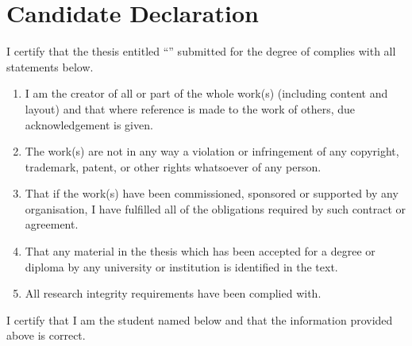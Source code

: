 \newpage
\chapter*{Candidate Declaration}

I certify that the thesis entitled ``\textit{\thetitle{}}'' submitted for the degree of \thedegree{} complies with all statements below.\bigskip
\begin{enumerate}[label=(\roman*)]
  \item I am the creator of all or part of the whole work(s) (including content and layout) and that where reference is made to the work of others, due acknowledgement is given.    
  \item The work(s) are not in any way a violation or infringement of any copyright, trademark, patent, or other rights whatsoever of any person.
  \item That if the work(s) have been commissioned, sponsored or supported by any organisation, I have fulfilled all of the obligations required by such contract or agreement.
  \item That any material in the thesis which has been accepted for a degree or diploma by any university or institution is identified in the text.
  \item All research integrity requirements have been complied with.
\end{enumerate}\bigskip
I certify that I am the student named below and that the information provided above is correct.

\vspace{2cm}

\noindent
\hspace{\fill}
\parbox[b]{0.4\linewidth}{
  \hrulefill\\
  \raggedleft
  \theauthor{}\\
  \footnotesize
  \thedate{}
}

%
%
%
%
%
